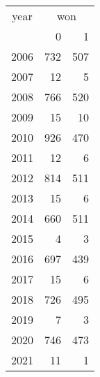 \footnotesize\begin{tabular}[t]{lrr}
\toprule
\multicolumn{1}{c}{year} & \multicolumn{2}{c}{won} \\
\cmidrule(l{3pt}r{3pt}){1-1} \cmidrule(l{3pt}r{3pt}){2-3}
  & 0 & 1\\
\midrule
2006 & 732 & 507\\
2007 & 12 & 5\\
2008 & 766 & 520\\
2009 & 15 & 10\\
2010 & 926 & 470\\
2011 & 12 & 6\\
2012 & 814 & 511\\
2013 & 15 & 6\\
2014 & 660 & 511\\
2015 & 4 & 3\\
2016 & 697 & 439\\
2017 & 15 & 6\\
2018 & 726 & 495\\
2019 & 7 & 3\\
2020 & 746 & 473\\
2021 & 11 & 1\\
\bottomrule
\end{tabular}
